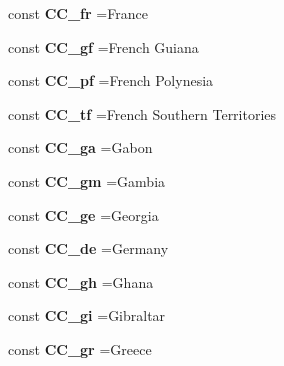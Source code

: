 \begin{DoxyCompactItemize}
const {\bfseries C\+C\+\_\+fr} =\textquotesingle{}France\textquotesingle{}
\item 
\hypertarget{class_i_s_o_a557b6c4bbee3a82abde9384b141f4aaf}{}\label{class_i_s_o_a557b6c4bbee3a82abde9384b141f4aaf} 
const {\bfseries C\+C\+\_\+gf} =\textquotesingle{}French Guiana\textquotesingle{}
\item 
\hypertarget{class_i_s_o_a6dedbe9b6cf2ad74643cc90f6e2ad035}{}\label{class_i_s_o_a6dedbe9b6cf2ad74643cc90f6e2ad035} 
const {\bfseries C\+C\+\_\+pf} =\textquotesingle{}French Polynesia\textquotesingle{}
\item 
\hypertarget{class_i_s_o_a7dd702b8483fee9bdac52aeea677497d}{}\label{class_i_s_o_a7dd702b8483fee9bdac52aeea677497d} 
const {\bfseries C\+C\+\_\+tf} =\textquotesingle{}French Southern Territories\textquotesingle{}
\item 
\hypertarget{class_i_s_o_a0e592da75e62c88bcfe9c4b58292f06a}{}\label{class_i_s_o_a0e592da75e62c88bcfe9c4b58292f06a} 
const {\bfseries C\+C\+\_\+ga} =\textquotesingle{}Gabon\textquotesingle{}
\item 
\hypertarget{class_i_s_o_ada4706e4182e0d25bb9a5a36bc6f9a3a}{}\label{class_i_s_o_ada4706e4182e0d25bb9a5a36bc6f9a3a} 
const {\bfseries C\+C\+\_\+gm} =\textquotesingle{}Gambia\textquotesingle{}
\item 
\hypertarget{class_i_s_o_a3a2c84cc57c0b6d728260c1969999851}{}\label{class_i_s_o_a3a2c84cc57c0b6d728260c1969999851} 
const {\bfseries C\+C\+\_\+ge} =\textquotesingle{}Georgia\textquotesingle{}
\item 
\hypertarget{class_i_s_o_ade626ac2d5271eeb689f68d21fbd5de8}{}\label{class_i_s_o_ade626ac2d5271eeb689f68d21fbd5de8} 
const {\bfseries C\+C\+\_\+de} =\textquotesingle{}Germany\textquotesingle{}
\item 
\hypertarget{class_i_s_o_a396effa68fd40949203104718441a868}{}\label{class_i_s_o_a396effa68fd40949203104718441a868} 
const {\bfseries C\+C\+\_\+gh} =\textquotesingle{}Ghana\textquotesingle{}
\item 
\hypertarget{class_i_s_o_a1d936b330fb759412886c61a34da41a2}{}\label{class_i_s_o_a1d936b330fb759412886c61a34da41a2} 
const {\bfseries C\+C\+\_\+gi} =\textquotesingle{}Gibraltar\textquotesingle{}
\item 
\hypertarget{class_i_s_o_a3f122011e7d5537d4874102c09d39986}{}\label{class_i_s_o_a3f122011e7d5537d4874102c09d39986} 
const {\bfseries C\+C\+\_\+gr} =\textquotesingle{}Greece\textquotesingle{}
\item 
\hypertarget{class_i_s_o_aef86ce6ca5cbc680ddfa446f5bba69b4}{}\label{class_i_s_o_aef86ce6ca5cbc680ddfa446f5bba69b4} 

\end{DoxyCompactItemize}
